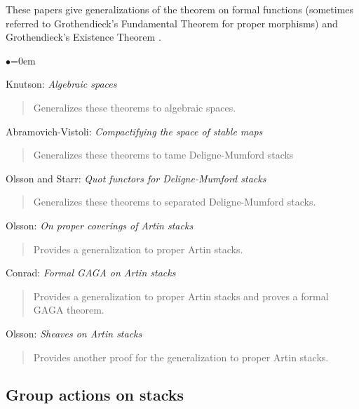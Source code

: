 \noindent
These papers give generalizations of the theorem on formal functions
\cite[III.4.1.5]{EGA} (sometimes referred to Grothendieck's Fundamental
Theorem for proper morphisms) and Grothendieck's Existence
Theorem \cite[III.5.1.4]{EGA}.
\begin{list}{$\bullet$}{\leftmargin=0em}
\item Knutson:  \emph{Algebraic spaces} \cite[Chapter V]{Kn}
\begin{quote}
Generalizes these theorems to algebraic spaces.
\end{quote}
\smallskip

\item Abramovich-Vistoli: \emph{Compactifying the space of stable maps}
\cite[A.1.1]{abramovich-vistoli}
\begin{quote}
Generalizes these theorems to tame Deligne-Mumford stacks
\end{quote}
\smallskip

\item Olsson and Starr:  \emph{Quot functors for Deligne-Mumford stacks}
\cite{olsson-starr}
\begin{quote}
Generalizes these theorems to separated Deligne-Mumford stacks.
\end{quote}
\smallskip
\item Olsson: \emph{On proper coverings of Artin stacks}
\cite{olsson_proper}
\begin{quote}
Provides a generalization to proper Artin stacks.
\end{quote}
\smallskip

\item Conrad: \emph{Formal GAGA on Artin stacks} \cite{conrad_gaga}
\begin{quote}
Provides a generalization to proper Artin stacks and proves a formal
GAGA theorem.
\end{quote}
\smallskip

\item Olsson: \emph{Sheaves on Artin stacks} \cite{olsson_sheaves}
\begin{quote}
Provides another proof for the generalization to proper Artin stacks.
\end{quote}
\end{list}


\subsection{Group actions on stacks}
\label{subsection-group-actions}

